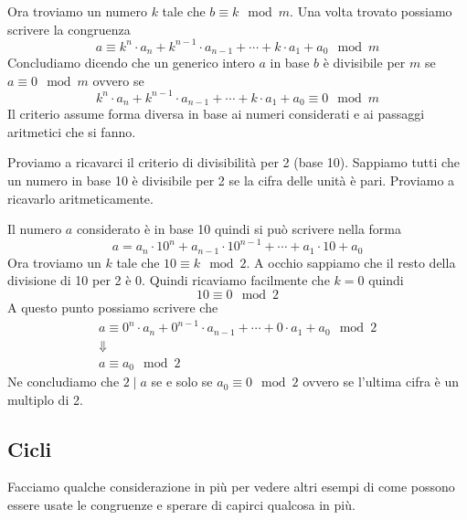 Ora troviamo un numero $k$ tale che $b \equiv k \mod{m}$. Una volta trovato possiamo scrivere
la congruenza
\begin{equation*}
	a \equiv k^n \cdot a_n + k^{n-1} \cdot a_{n-1} + \cdots + k \cdot a_1 + a_0 \mod{m}
\end{equation*}
Concludiamo dicendo che un generico intero $a$ in base $b$ \`e divisibile per $m$ se
$a \equiv 0 \mod{m}$ ovvero se
\begin{equation*}
	k^n \cdot a_n + k^{n-1} \cdot a_{n-1} + \cdots + k \cdot a_1 + a_0 \equiv 0 \mod{m}
\end{equation*}
Il criterio assume forma diversa in base ai numeri considerati e ai passaggi aritmetici che
si fanno.

\begin{example}
	Proviamo a ricavarci il criterio di divisibilit\`a per 2 (base 10). Sappiamo tutti che un
	numero in base 10 \`e divisibile per 2 se la cifra delle unit\`a \`e pari. Proviamo a
	ricavarlo aritmeticamente.

	Il numero $a$ considerato \`e in base 10 quindi si pu\`o scrivere nella forma
	\begin{equation*}
		a = a_n \cdot 10^n + a_{n-1} \cdot 10^{n - 1} + \cdots + a_1 \cdot 10 + a_0
	\end{equation*}
	Ora troviamo un $k$ tale che $10 \equiv k \mod{2}$. A occhio sappiamo che il resto della
	divisione di 10 per 2 \`e 0. Quindi ricaviamo facilmente che $k = 0$ quindi
	\begin{equation*}
		10 \equiv 0 \mod{2}
	\end{equation*}
	A questo punto possiamo scrivere che
	\begin{equation*}
		\begin{array}{c}
			a \equiv 0^n \cdot a_n + 0^{n-1} \cdot a_{n-1} +
			\cdots + 0 \cdot a_1 + a_0 \mod{2} \\
			\Downarrow                         \\
			a \equiv a_0 \mod{2}
		\end{array}
	\end{equation*}
	Ne concludiamo che $2 \mid a$ se e solo se $a_0 \equiv 0 \mod{2}$ ovvero se l'ultima cifra
	\`e un multiplo di 2.
\end{example}

\subsection{Cicli}
Facciamo qualche considerazione in pi\`u per vedere altri esempi di come possono essere usate
le congruenze e sperare di capirci qualcosa in pi\`u.

